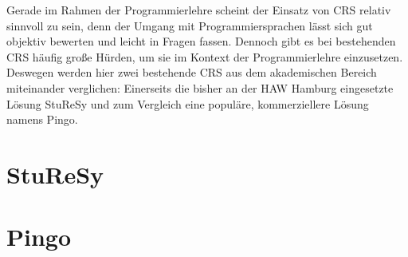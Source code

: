 Gerade im Rahmen der Programmierlehre scheint der Einsatz von CRS relativ sinnvoll zu sein, denn der Umgang mit Programmiersprachen lässt sich gut objektiv bewerten und leicht in Fragen fassen. Dennoch gibt es bei bestehenden CRS häufig große Hürden, um sie im Kontext der Programmierlehre einzusetzen. Deswegen werden hier zwei bestehende CRS aus dem akademischen Bereich miteinander verglichen: Einerseits die bisher an der HAW Hamburg eingesetzte Lösung StuReSy und zum Vergleich eine populäre, kommerziellere Lösung namens Pingo.

\section{StuReSy}
\label{chap:sturesy}


\newpage
\section{Pingo}
\label{chap:pingo}
